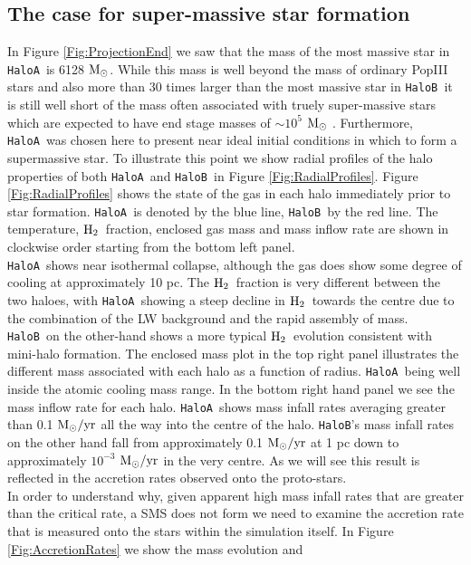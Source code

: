\documentclass[graphics, twocolumn, usenatbib]{mn2e}
\newcommand{\msolar} {$\rm{M_{\odot}}~$}
\newcommand{\msolarc} {$\rm{M_{\odot}}$}
\newcommand{\msolaryr} {$\rm{M_{\odot}/yr}~$}
\newcommand{\molH} {$\rm{H_2}$~}
\newcommand{\ha} {\texttt{HaloA~}}
\newcommand{\hb} {\texttt{HaloB~}}
\newcommand{\hbc} {\texttt{HaloB}}
\begin{document}
\subsection{The case for super-massive star formation}
In Figure \ref{Fig:ProjectionEnd} we saw that the mass of the most massive star in \ha is
6128 \msolarc. While this mass is well beyond the mass of ordinary PopIII stars \citep{Turk_2009, Greif_2011, Wise_2012b, Crosby_2013, Susa_2014, Hirano_2014, Stacy_2016} and also more than 30 times
larger than the most massive star in \hb it is still well short of the mass often associated with
truely super-massive stars \citep[e.g.][]{Woods_2018} which are expected to have
end stage masses of $\sim 10^5$ \msolar. Furthermore, \ha was chosen here to present near ideal initial conditions in which to form a supermassive star.
To illustrate this point we show radial profiles of the halo properties of both \ha and \hb in
Figure \ref{Fig:RadialProfiles}. Figure \ref{Fig:RadialProfiles} shows the state of the gas in each halo immediately prior to star formation. \ha is denoted by the blue line, \hb by the red line.
The temperature, \molH fraction, enclosed gas mass and mass inflow rate are shown in clockwise order starting from the bottom left panel. \\
\indent \ha shows near isothermal collapse, although the gas does
show some degree of cooling at approximately 10 pc. The \molH fraction is very different between
the two haloes, with \ha showing a steep decline in \molH towards the centre due to the combination
of the LW background and the rapid assembly of mass. \hb on the other-hand shows a more typical
\molH evolution consistent with mini-halo formation. The enclosed mass plot in the top right panel
illustrates the different mass associated with each halo as a function of radius. \ha being well
inside the atomic cooling mass range. In the bottom right hand panel we see the mass inflow rate for
each halo. \ha shows mass infall rates averaging greater than 0.1 \msolaryr all the way into the
centre of the halo. \hbc's mass infall rates on the other hand fall from approximately
0.1 \msolaryr at 1 pc down to approximately $10^{-3}$ \msolaryr in the very centre. As we will see
this result is reflected in the accretion rates observed onto the proto-stars. \\
\indent In order to understand why, given apparent high mass infall rates that are greater than the
critical rate, a SMS does not form we need to examine the accretion rate that is measured onto the
stars within the simulation itself. In Figure \ref{Fig:AccretionRates} we show the mass evolution and
\end{document}
